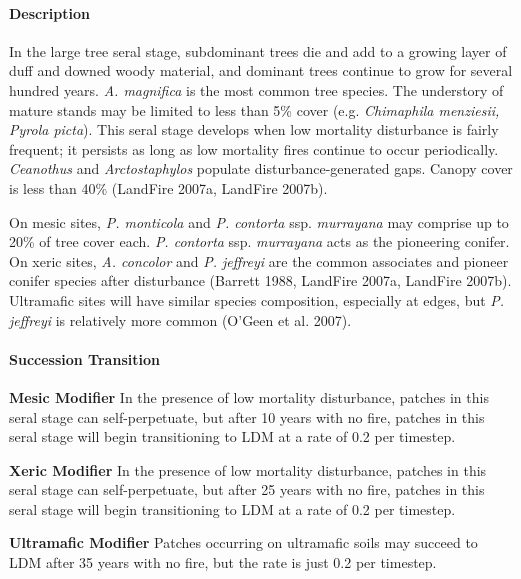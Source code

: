 \paragraph{Description} In the large tree seral stage, subdominant trees die and add to a growing layer of duff and downed woody material, and dominant trees continue to grow for several hundred years. \emph{A. magnifica} is the most common tree species. The understory of mature stands may be limited to less than 5\% cover (e.g. \emph{Chimaphila menziesii, Pyrola picta}). This seral stage develops when low mortality disturbance is fairly frequent; it persists as long as low mortality fires continue to occur periodically. \emph{Ceanothus} and \emph{Arctostaphylos} populate disturbance-generated gaps. Canopy cover is less than 40\% (LandFire 2007a, LandFire 2007b).

On mesic sites, \emph{P. monticola} and \emph{P. contorta} ssp. \emph{murrayana} may comprise up to 20\% of tree cover each. \emph{P. contorta} ssp. \emph{murrayana} acts as the pioneering conifer. On xeric sites, \emph{A. concolor} and \emph{P. jeffreyi} are the common associates and pioneer conifer species after disturbance (Barrett 1988, LandFire 2007a, LandFire 2007b). Ultramafic sites will have similar species composition, especially at edges, but \emph{P. jeffreyi} is relatively more common (O'Geen et al. 2007).


\paragraph{Succession Transition}
\begin{adjustwidth}{2cm}{}
\noindent \textbf{Mesic Modifier } In the presence of low mortality disturbance, patches in this seral stage can self-perpetuate, but after 10 years with no fire, patches in this seral stage will begin transitioning to LDM at a rate of 0.2 per timestep.

\medskip
\noindent \textbf{Xeric Modifier}  In the presence of low mortality disturbance, patches in this seral stage can self-perpetuate, but after 25 years with no fire, patches in this seral stage will begin transitioning to LDM at a rate of 0.2 per timestep.

\medskip
\noindent \textbf{Ultramafic Modifier} Patches occurring on ultramafic soils may succeed to LDM after 35 years with no fire, but the rate is just 0.2 per timestep.

\end{adjustwidth}

